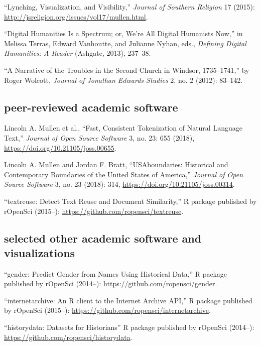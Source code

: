 \documentclass[11pt]{article}
\begin{document}
``Lynching, Visualization, and Visibility,'' \emph{Journal of Southern 
  Religion} 17 (2015): \url{http://jsreligion.org/issues/vol17/mullen.html}.

``Digital Humanities Is a Spectrum; or, We're All Digital Humanists
Now,'' in Melissa Terras, Edward Vanhoutte, and Julianne Nyhan, eds.,
\emph{Defining Digital Humanities: A Reader} (Ashgate, 2013), 237--38.

``A Narrative of the Troubles in the Second Church in Windsor,
1735--1741,'' by Roger Wolcott, \emph{Journal of Jonathan Edwards
  Studies} 2, no. 2 (2012): 83--142.

\subsection{peer-reviewed academic software}\label{academic-software}

Lincoln A. Mullen et al., ``Fast, Consistent Tokenization of Natural Language 
Text,'' \emph{Journal of Open Source Software} 3, no. 23: 655 (2018), 
\url{https://doi.org/10.21105/joss.00655}.

Lincoln A. Mullen and Jordan F. Bratt, ``USAboundaries: Historical and 
Contemporary Boundaries of the United States of America,'' \emph{Journal of 
Open Source Software} 3, no. 23 (2018): 314, 
\url{https://doi.org/10.21105/joss.00314}.

``textreuse: Detect Text Reuse and Document Similarity,'' R package published 
by rOpenSci (2015--): 
\url{https://github.com/ropensci/textreuse}.

\subsection{selected other academic software and visualizations}\label{other-academic-software}

``gender: Predict Gender from Names Using Historical Data,'' R package 
published by rOpenSci (2014--): \url{https://github.com/ropensci/gender}.

``internetarchive: An R client to the Internet Archive API,'' R package 
published by rOpenSci (2015--): 
\url{https://github.com/ropensci/internetarchive}.

``historydata: Datasets for Historians'' R package published by rOpenSci 
(2014--):  
\url{https://github.com/ropensci/historydata}.

\end{document}
